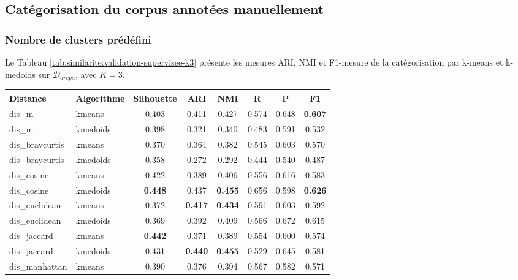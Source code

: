 \subsection{Catégorisation du corpus annotées manuellement}
\subsubsection{Nombre de clusters prédéfini}
 Le Tableau \ref{tab:similarite:validation-supervisee-k3} présente les mesures ARI, NMI et F1-mesure de la catégorisation par k-means et k-medoids sur $\mathcal{D}_{arcpa}$, avec $K=3$. 

\begin{table}[!htb]
	\centering \scriptsize
	\begin{tabular}[pos]{|l|l|c|c|c|c|c|c|}
		\hline
		\textbf{Distance}& \textbf{Algorithme}& \textbf{Silhouette}& \textbf{ARI} & \textbf{NMI} & \textbf{R} & \textbf{P} & \textbf{F1} \\ \hline
		 dis\_m          & kmeans    & 0.403      & 0.411 & 0.427 & 0.574  & 0.648     & \textbf{0.607} \\ \hline
		 dis\_m          & kmedoids  & 0.398      & 0.321 & 0.340 & 0.483  & 0.591     & 0.532 \\ \hline
		 dis\_braycurtis & kmeans    & 0.370      & 0.364 & 0.382 & 0.545  & 0.603     & 0.570 \\ \hline
		 dis\_braycurtis & kmedoids  & 0.358      & 0.272 & 0.292 & 0.444  & 0.540     & 0.487 \\ \hline
		 dis\_cosine     & kmeans    & 0.422     & 0.389 & 0.406 & 0.556  & 0.616     & 0.583 \\ \hline
		 dis\_cosine     & kmedoids  & \textbf{0.448}      & 0.437 & \textbf{0.455} & 0.656  & 0.598     & \textbf{0.626} \\ \hline
		 dis\_euclidean  & kmeans    & 0.372      & \textbf{0.417} & \textbf{0.434} & 0.591  & 0.603     & 0.592 \\ \hline
		 dis\_euclidean  & kmedoids  & 0.369      & 0.392 & 0.409 & 0.566  & 0.672     & 0.615 \\ \hline
		 dis\_jaccard    & kmeans    & \textbf{0.442}      & 0.371 & 0.389 & 0.554  & 0.600     & 0.574 \\ \hline
		 dis\_jaccard    & kmedoids  & 0.431      & \textbf{0.440} & \textbf{0.455} & 0.529  & 0.645     & 0.581 \\ \hline
		 dis\_manhattan  & kmeans    & 0.390      & 0.376 & 0.394 & 0.567  & 0.582     & 0.571 \\ \hline

\end{tabular}
\end{table}
